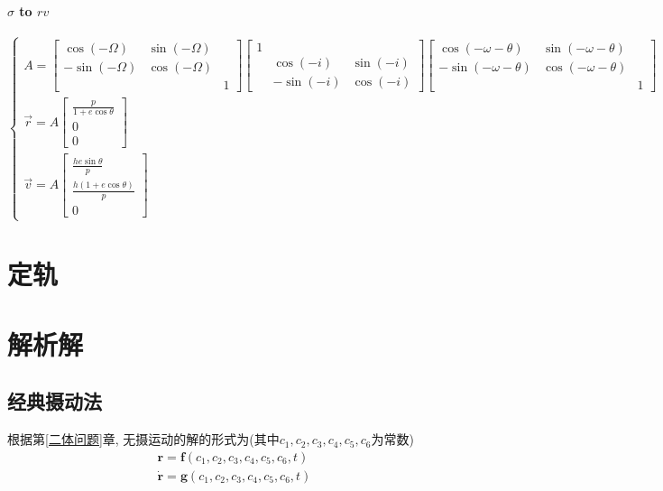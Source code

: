 \documentclass[UTF8]{ctexart}
\begin{document}
\paragraph{$\sigma$ to $rv$}
\begin{equation}
	\begin{cases}
			A=\begin{bmatrix}
			\cos(-\Omega) & \sin(-\Omega) & \\
			-\sin(-\Omega) & \cos(-\Omega) & \\
			& & 1
		\end{bmatrix}\begin{bmatrix}
			1 & &\\
			& \cos(-i) & \sin(-i)\\
			& -\sin(-i) & \cos(-i)
		\end{bmatrix}\begin{bmatrix}
			\cos(-\omega-\theta) & \sin(-\omega-\theta) & \\
			-\sin(-\omega-\theta) & \cos(-\omega-\theta) &\\
			& & 1
		\end{bmatrix}\\
		\vec{r}=A\begin{bmatrix}
			\frac{p}{1+e\cos\theta}\\
			0\\
			0
		\end{bmatrix}\\
		\vec{v}=A\begin{bmatrix}
		\frac{he\sin\theta}{p}\\
		\frac{h(1+e\cos\theta)}{p}\\
		0
		\end{bmatrix}
	\end{cases}
\end{equation}

\section{定轨}

\section{解析解}
\subsection{经典摄动法}
根据第\ref{二体问题}章, 无摄运动的解的形式为(其中$c_1,c_2,c_3,c_4,c_5,c_6$为常数)
\begin{gather}\label{eq:3.14}
	\boldsymbol{r}=\boldsymbol{f}(c_1,c_2,c_3,c_4,c_5,c_6,t)\\
	\label{eq:3.15}
	\dot{\boldsymbol{r}}=\boldsymbol{g}(c_1,c_2,c_3,c_4,c_5,c_6,t)
\end{gather}
\end{document}
